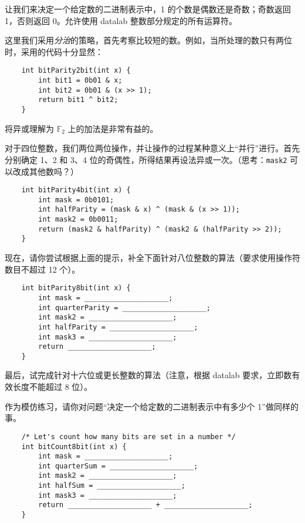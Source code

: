     \begin{example}[计数]
        让我们来决定一个给定数的二进制表示中，1 的个数是偶数还是奇数；奇数返回 1，否则返回 0。允许使用 datalab 整数部分规定的所有运算符。
        
        这里我们采用\emph{分治}的策略，首先考察比较短的数。例如，当所处理的数只有两位时，采用的代码十分显然：
        \begin{verbatim}
    int bitParity2bit(int x) {
        int bit1 = 0b01 & x;
        int bit2 = 0b01 & (x >> 1);
        return bit1 ^ bit2;
    }
        \end{verbatim}
        将异或理解为 $\mathbb F_2$ 上的加法是非常有益的。

        对于四位整数，我们两位两位操作，并让操作的过程某种意义上“并行”进行。首先分别确定 1、2 和 3、4 位的奇偶性，所得结果再设法异或一次。（思考：\texttt{mask2} 可以改成其他数吗？）
        \begin{verbatim}
    int bitParity4bit(int x) {
        int mask = 0b0101;
        int halfParity = (mask & x) ^ (mask & (x >> 1));
        int mask2 = 0b0011;
        return (mask2 & halfParity) ^ (mask2 & (halfParity >> 2));
    }
        \end{verbatim}

        现在，请你尝试根据上面的提示，补全下面针对八位整数的算法（要求使用操作符数目不超过 12 个）。
        \begin{verbatim}
    int bitParity8bit(int x) {
        int mask = ____________________;
        int quarterParity = ____________________;
        int mask2 = ____________________;
        int halfParity = ____________________;
        int mask3 = ____________________;
        return ____________________;
    }
        \end{verbatim}
        最后，试完成针对十六位或更长整数的算法（注意，根据 datalab 要求，立即数有效长度不能超过 8 位）。
        
        作为模仿练习，请你对问题“决定一个给定数的二进制表示中有多少个 1”做同样的事。
        \begin{verbatim}
    /* Let's count how many bits are set in a number */
    int bitCount8bit(int x) {
        int mask = ____________________;
        int quarterSum = ____________________;
        int mask2 = ____________________;
        int halfSum = ____________________;
        int mask3 = ____________________;
        return ____________________ + ____________________;
    }
        \end{verbatim}
    \end{example}

